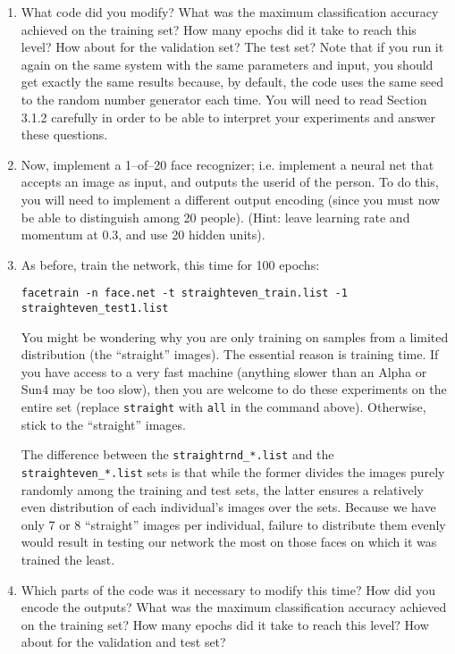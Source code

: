 \begin{enumerate}
\item What code did you modify?  What was the maximum classification accuracy 
achieved on the training set?  How many epochs did it take to reach this
level?  How about for the validation set?  The test set?  Note that if you run
it again on the same system with the same parameters and input, you should get
exactly the same results because, by default, the code uses the same seed to
the random number generator each time. You will need to read Section
3.1.2 carefully in order to be able to interpret your experiments and
answer these questions.

\item Now, implement a 1--of--20 face recognizer; i.e. implement a neural 
net that accepts an image as input, and outputs the userid of the person.  To
do this, you will need to implement a different output encoding (since you
must now be able to distinguish among 20 people).  (Hint: leave learning rate
and momentum at 0.3, and use 20 hidden units).

\item As before, train the network, this time for 100 epochs:

{\tt facetrain -n face.net -t straighteven\_train.list -1 straighteven\_test1.list}

You might be wondering why you are only training on samples from a limited
distribution (the ``straight'' images).  The essential reason is training
time.  If you have access to a very fast machine (anything slower than an
Alpha or Sun4 may be too slow), then you are welcome to do these experiments
on the entire set (replace {\tt straight} with {\tt all} in the command above).
Otherwise, stick to the ``straight'' images.

The difference between the {\tt straightrnd\_*.list} and the {\tt
straighteven\_*.list} sets is that while the former divides the images purely
randomly among the training and test sets, the latter ensures a relatively
even distribution of each individual's images over the sets.  Because we have
only 7 or 8 ``straight'' images per individual, failure to distribute them
evenly would result in testing our network the most on those faces on which it
was trained the least.

\item Which parts of the code was it necessary to modify this time?
How did you encode the outputs?  What was the maximum classification accuracy
achieved on the training set?  How many epochs did it take to reach this
level?  How about for the validation and test set?


\end{enumerate}
